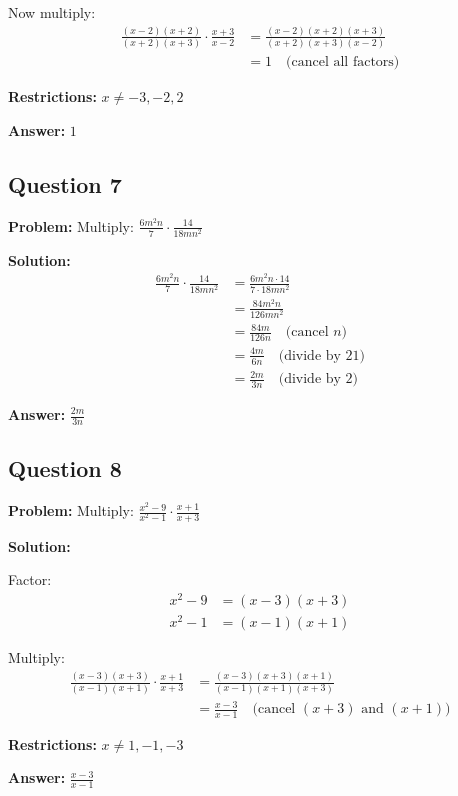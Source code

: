 \documentclass[12pt]{article}
\begin{document}
Now multiply:
\begin{align*}
\frac{(x-2)(x+2)}{(x+2)(x+3)} \cdot \frac{x+3}{x-2} &= \frac{(x-2)(x+2)(x+3)}{(x+2)(x+3)(x-2)} \\
&= 1 \quad \text{(cancel all factors)}
\end{align*}

\textbf{Restrictions:} $x \neq -3, -2, 2$

\textbf{Answer:} $\boxed{1}$

\subsection*{Question 7}
\textbf{Problem:} Multiply: $\frac{6m^2n}{7} \cdot \frac{14}{18mn^2}$

\textbf{Solution:}
\begin{align*}
\frac{6m^2n}{7} \cdot \frac{14}{18mn^2} &= \frac{6m^2n \cdot 14}{7 \cdot 18mn^2} \\
&= \frac{84m^2n}{126mn^2} \\
&= \frac{84m}{126n} \quad \text{(cancel } n \text{)} \\
&= \frac{4m}{6n} \quad \text{(divide by 21)} \\
&= \frac{2m}{3n} \quad \text{(divide by 2)}
\end{align*}

\textbf{Answer:} $\boxed{\frac{2m}{3n}}$

\subsection*{Question 8}
\textbf{Problem:} Multiply: $\frac{x^2-9}{x^2-1} \cdot \frac{x+1}{x+3}$

\textbf{Solution:}

Factor:
\begin{align*}
x^2 - 9 &= (x-3)(x+3) \\
x^2 - 1 &= (x-1)(x+1)
\end{align*}

Multiply:
\begin{align*}
\frac{(x-3)(x+3)}{(x-1)(x+1)} \cdot \frac{x+1}{x+3} &= \frac{(x-3)(x+3)(x+1)}{(x-1)(x+1)(x+3)} \\
&= \frac{x-3}{x-1} \quad \text{(cancel } (x+3) \text{ and } (x+1) \text{)}
\end{align*}

\textbf{Restrictions:} $x \neq 1, -1, -3$

\textbf{Answer:} $\boxed{\frac{x-3}{x-1}}$
\end{document}
